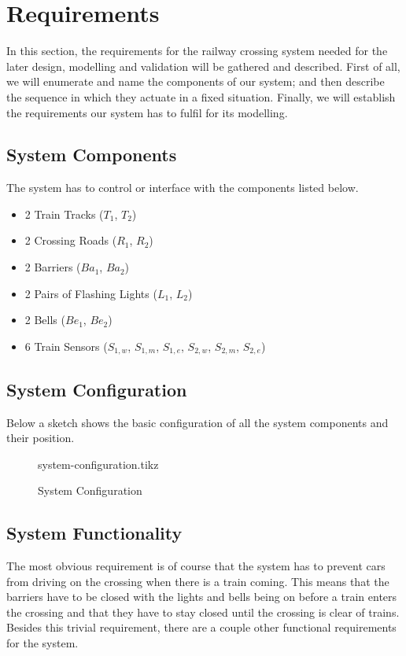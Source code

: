 \documentclass[final]{report}
\begin{document}
\chapter{Requirements}
In this section, the requirements for the railway crossing system needed for the later design, modelling and validation will be gathered and described.
First of all, we will enumerate and name the components of our system; and then describe the sequence in which they actuate in a fixed situation.
Finally, we will establish the requirements our system has to fulfil for its modelling.

\section{System Components}
The system has to control or interface with the components listed below.
\begin{itemize}
\item 2 Train Tracks ($T_{1}$, $T_{2}$)
\item 2 Crossing Roads ($R_{1}$, $R_{2}$)
\item 2 Barriers ($Ba_{1}$, $Ba_{2}$)
\item 2 Pairs of Flashing Lights ($L_{1}$, $L_{2}$)
\item 2 Bells ($Be_{1}$, $Be_{2}$)
\item 6 Train Sensors ($S_{1,w}$, $S_{1,m}$, $S_{1,e}$, $S_{2,w}$, $S_{2,m}$, $S_{2,e}$)
\end{itemize}

\section{System Configuration}
Below a sketch shows the basic configuration of all the system components and their position.
\begin{figure}[H]
	\centering
	{system-configuration.tikz}
	\caption{System Configuration}
	\label{fig:system-configuration}
\end{figure}

\section{System Functionality}\label{sec:requirements}
The most obvious requirement is of course that the system has to prevent cars from driving on the crossing when there is a train coming.
This means that the barriers have to be closed with the lights and bells being on before a train enters the crossing and that they have to stay closed until the crossing is clear of trains.
Besides this trivial requirement, there are a couple other functional requirements for the system.
\end{document}
